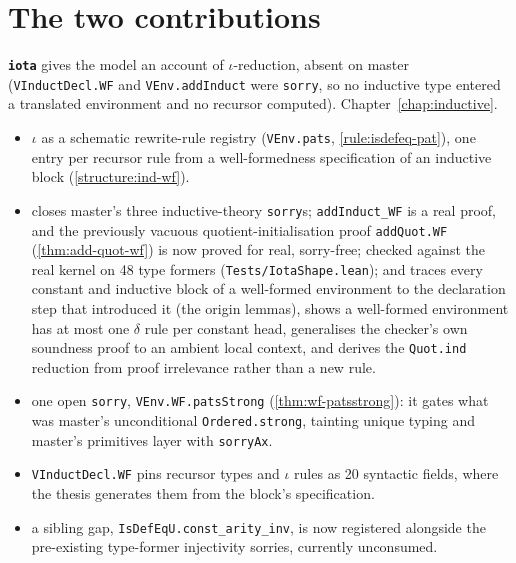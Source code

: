 \section{The two contributions}
\label{sec:intro-branches}

\textbf{\texttt{iota}} gives the model an account of $\iota$-reduction, absent on master
(\texttt{VInductDecl.WF} and \texttt{VEnv.addInduct} were \texttt{sorry}, so no inductive type
entered a translated environment and no recursor computed). Chapter~\ref{chap:inductive}.
\begin{itemize}
\item {} $\iota$ as a schematic rewrite-rule registry (\texttt{VEnv.pats},
\ref{rule:isdefeq-pat}), one entry per recursor rule from a well-formedness specification of an
inductive block (\ref{structure:ind-wf}).
\item {} closes master's three inductive-theory \texttt{sorry}s; \texttt{addInduct\_WF}
is a real proof, and the previously vacuous quotient-initialisation proof \texttt{addQuot.WF}
(\ref{thm:add-quot-wf}) is now proved for real, sorry-free; checked against the real kernel on 48
type formers (\texttt{Tests/IotaShape.lean}); and traces every constant and inductive block of
a well-formed environment to the declaration step that introduced it (the origin lemmas), shows
a well-formed environment has at most one $\delta$ rule per constant head, generalises the
checker's own soundness proof to an ambient local context, and derives the
\texttt{Quot.ind} reduction from proof irrelevance rather than a new rule.
\item {} one open \texttt{sorry}, \texttt{VEnv.WF.patsStrong} (\ref{thm:wf-patsstrong}):
it gates what was master's unconditional \texttt{Ordered.strong}, tainting unique typing and
master's primitives layer with \texttt{sorryAx}.
\item {} \texttt{VInductDecl.WF} pins recursor types and $\iota$ rules as 20 syntactic
fields, where the thesis generates them from the block's specification.
\item {} a sibling gap, \texttt{IsDefEqU.const\_arity\_inv}, is now registered alongside
the pre-existing type-former injectivity sorries, currently unconsumed.
\end{itemize}

